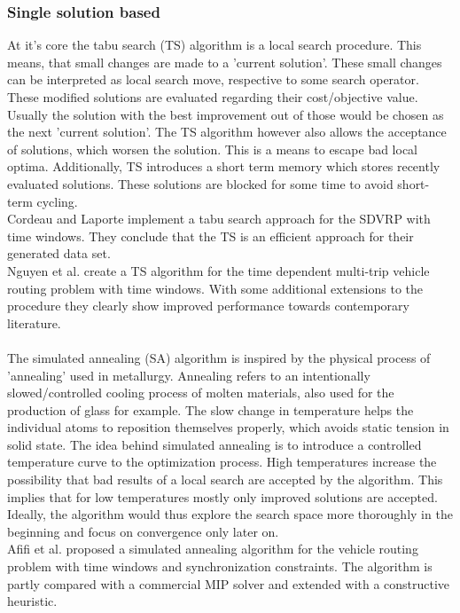 \subsubsection{Single solution based}

At it's core the tabu search (TS) algorithm is a local search procedure. This means, that small changes are made to a 'current solution'. These small changes can be interpreted as local search move, respective to some search operator. These modified solutions are evaluated regarding their cost/objective value. Usually the solution with the best improvement out of those would be chosen as the next 'current solution'. The TS algorithm however also allows the acceptance of solutions, which worsen the solution. This is a means to escape bad local optima. Additionally, TS introduces a short term memory which stores recently evaluated solutions. These solutions are blocked for some time to avoid short-term cycling.\\
Cordeau and Laporte \cite{cordeau_tabu_2001} implement a tabu search approach for the SDVRP with time windows. They conclude that the TS is an efficient approach for their generated data set.\\
Nguyen et al. \cite{nguyen_tabu_2013} create a TS algorithm for the time dependent multi-trip vehicle routing problem with time windows. With some additional extensions to the procedure they clearly show improved performance towards contemporary literature.\\ \\
The simulated annealing (SA) algorithm is inspired by the physical process of 'annealing' used in metallurgy. Annealing refers to an intentionally slowed/controlled cooling process of molten materials, also used for the production of glass for example. The slow change in temperature helps the individual atoms to reposition themselves properly, which avoids static tension in solid state. The idea behind simulated annealing is to introduce a controlled temperature curve to the optimization process. High temperatures increase the possibility that bad results of a local search are accepted by the algorithm. This implies that for low temperatures mostly only improved solutions are accepted. Ideally, the algorithm would thus explore the search space more thoroughly in the beginning and focus on convergence only later on.\\
Afifi et al. \cite{afifi_simulated_2013} proposed a simulated annealing algorithm for the vehicle routing problem with time windows and synchronization constraints. The algorithm is partly compared with a commercial MIP solver and extended with a constructive heuristic.\\ \\ %
